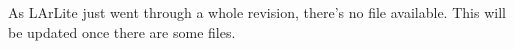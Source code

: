 
As LArLite just went through a whole revision, there's no file available.
This will be updated once there are some files.

